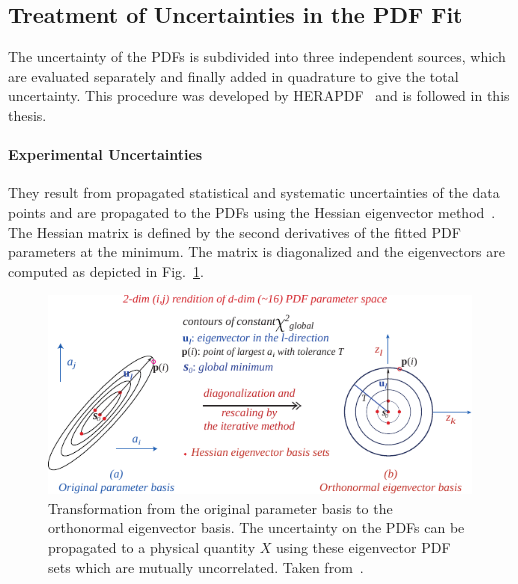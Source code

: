 \subsection{Treatment of Uncertainties in the PDF Fit}
\label{section:treatment_pdf_uncertainties}

The uncertainty of the PDFs is subdivided into three independent sources, which
are evaluated separately and finally added in quadrature to give the total
uncertainty. This procedure was developed by HERAPDF~\cite{Abramowicz:2015mha}
and is followed in this thesis.

\paragraph{Experimental Uncertainties} 
They result from propagated statistical and systematic uncertainties of the data
points and are propagated to the PDFs using the Hessian eigenvector
method~\cite{Pumplin:2001ct}. The Hessian matrix is defined by the second
derivatives of the fitted PDF parameters at the \chisq minimum. The matrix is
diagonalized and the eigenvectors are computed as depicted in
Fig.~\ref{fig:eigenvector_basis_set}. 

\begin{figure}[htb]
  \centering
  \includegraphics[width=1.0\textwidth]{figures/pdf_constraints/hessianmethod.pdf}
  \caption[Transformation of the parameter basis to the eigenvector basis.]
    {Transformation from the original parameter basis to the orthonormal
    eigenvector basis. The uncertainty on the PDFs can be propagated to a
    physical quantity $X$ using these eigenvector PDF sets which are mutually
    uncorrelated. Taken from~\cite{Pumplin:2001ct}.}
    \label{fig:eigenvector_basis_set}
\end{figure}

